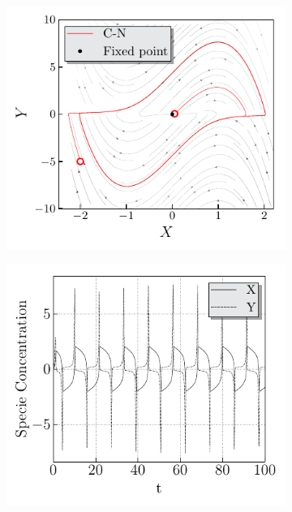 \begin{figure}[H]
	\vspace{-0.5cm}
    \begin{subfigure}{.5\textwidth}
    \centering
    \includegraphics[width=1.\linewidth, angle=0, clip]{03_Cap3/figures/VanderPol2__Phase_Space_ep5.pdf}
    \end{subfigure}
    \begin{subfigure}{.5\textwidth}
    \centering
    \includegraphics[width=1.\linewidth, angle=0, clip]{03_Cap3/figures/VanderPol2__2nd_Time_Evolution_ep5.pdf}
    \end{subfigure}
    \vspace{-0.5cm}
\end{figure}


